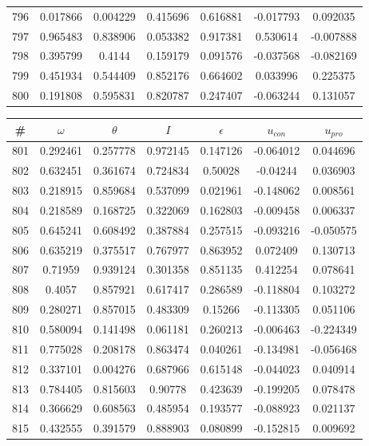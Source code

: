\begin{table}
\begin{tabular}{c|c|c|c|c|c|c}
796 & 0.017866 & 0.004229 & 0.415696 & 0.616881 & -0.017793 & 0.092035\\
797 & 0.965483 & 0.838906 & 0.053382 & 0.917381 & 0.530614 & -0.007888\\
798 & 0.395799 & 0.4144 & 0.159179 & 0.091576 & -0.037568 & -0.082169\\
799 & 0.451934 & 0.544409 & 0.852176 & 0.664602 & 0.033996 & 0.225375\\
800 & 0.191808 & 0.595831 & 0.820787 & 0.247407 & -0.063244 & 0.131057\\
\end{tabular}
\end{table}
\newpage
\begin{table}
\begin{tabular}{c|c|c|c|c|c|c}
\# & $\omega$ & $\theta$ & $I$ & $\epsilon$ & $u_{con}$ & $u_{pro}$\\
\hline
801 & 0.292461 & 0.257778 & 0.972145 & 0.147126 & -0.064012 & 0.044696\\
802 & 0.632451 & 0.361674 & 0.724834 & 0.50028 & -0.04244 & 0.036903\\
803 & 0.218915 & 0.859684 & 0.537099 & 0.021961 & -0.148062 & 0.008561\\
804 & 0.218589 & 0.168725 & 0.322069 & 0.162803 & -0.009458 & 0.006337\\
805 & 0.645241 & 0.608492 & 0.387884 & 0.257515 & -0.093216 & -0.050575\\
806 & 0.635219 & 0.375517 & 0.767977 & 0.863952 & 0.072409 & 0.130713\\
807 & 0.71959 & 0.939124 & 0.301358 & 0.851135 & 0.412254 & 0.078641\\
808 & 0.4057 & 0.857921 & 0.617417 & 0.286589 & -0.118804 & 0.103272\\
809 & 0.280271 & 0.857015 & 0.483309 & 0.15266 & -0.113305 & 0.051106\\
810 & 0.580094 & 0.141498 & 0.061181 & 0.260213 & -0.006463 & -0.224349\\
811 & 0.775028 & 0.208178 & 0.863474 & 0.040261 & -0.134981 & -0.056468\\
812 & 0.337101 & 0.004276 & 0.687966 & 0.615148 & -0.044023 & 0.040914\\
813 & 0.784405 & 0.815603 & 0.90778 & 0.423639 & -0.199205 & 0.078478\\
814 & 0.366629 & 0.608563 & 0.485954 & 0.193577 & -0.088923 & 0.021137\\
815 & 0.432555 & 0.391579 & 0.888903 & 0.080899 & -0.152815 & 0.009692\\

\end{tabular}
\end{table}
